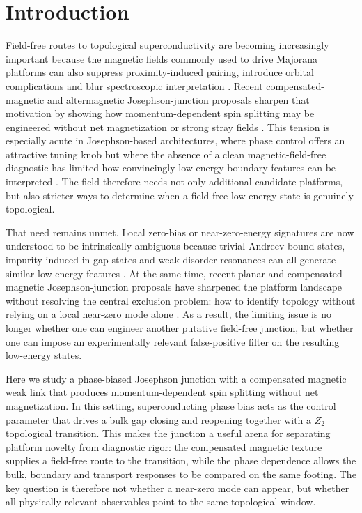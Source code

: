 \documentclass[11pt]{article}
\begin{document}
\section{Introduction}

Field-free routes to topological superconductivity are becoming increasingly important because the magnetic fields commonly used to drive Majorana platforms can also suppress proximity-induced pairing, introduce orbital complications and blur spectroscopic interpretation \cite{majorana-platform-review}. Recent compensated-magnetic and altermagnetic Josephson-junction proposals sharpen that motivation by showing how momentum-dependent spin splitting may be engineered without net magnetization or strong stray fields \cite{fieldfree-tsc-review}. This tension is especially acute in Josephson-based architectures, where phase control offers an attractive tuning knob but where the absence of a clean magnetic-field-free diagnostic has limited how convincingly low-energy boundary features can be interpreted \cite{phase-biased-jj-majorana-review}. The field therefore needs not only additional candidate platforms, but also stricter ways to determine when a field-free low-energy state is genuinely topological.

That need remains unmet. Local zero-bias or near-zero-energy signatures are now understood to be intrinsically ambiguous because trivial Andreev bound states, impurity-induced in-gap states and weak-disorder resonances can all generate similar low-energy features \cite{local-zbp-ambiguity-review,abs-false-positive-review,disorder-false-positive-review}. At the same time, recent planar and compensated-magnetic Josephson-junction proposals have sharpened the platform landscape without resolving the central exclusion problem: how to identify topology without relying on a local near-zero mode alone \cite{planar-jj-topological-sc,compensated-magnetic-jj-tajj-2026}. As a result, the limiting issue is no longer whether one can engineer another putative field-free junction, but whether one can impose an experimentally relevant false-positive filter on the resulting low-energy states.

Here we study a phase-biased Josephson junction with a compensated magnetic weak link that produces momentum-dependent spin splitting without net magnetization. In this setting, superconducting phase bias acts as the control parameter that drives a bulk gap closing and reopening together with a $Z_2$ topological transition. This makes the junction a useful arena for separating platform novelty from diagnostic rigor: the compensated magnetic texture supplies a field-free route to the transition, while the phase dependence allows the bulk, boundary and transport responses to be compared on the same footing. The key question is therefore not whether a near-zero mode can appear, but whether all physically relevant observables point to the same topological window.
\end{document}
